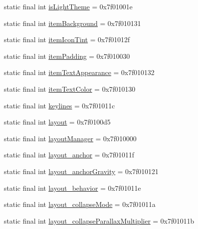 \begin{CompactItemize}
\item 
static final int \hyperlink{classandroid_1_1support_1_1v7_1_1cardview_1_1_r_1_1attr_21d182868570cf817d326710a36ec362}{isLightTheme} = 0x7f01001e
\item 
static final int \hyperlink{classandroid_1_1support_1_1v7_1_1cardview_1_1_r_1_1attr_697033ac5d7d3366d58de9382097c05d}{itemBackground} = 0x7f010131
\item 
static final int \hyperlink{classandroid_1_1support_1_1v7_1_1cardview_1_1_r_1_1attr_e2939f7481d5f41ad2ef121e6dc2c1f9}{itemIconTint} = 0x7f01012f
\item 
static final int \hyperlink{classandroid_1_1support_1_1v7_1_1cardview_1_1_r_1_1attr_5dcdfb800377892cf5fe1866c4266776}{itemPadding} = 0x7f010030
\item 
static final int \hyperlink{classandroid_1_1support_1_1v7_1_1cardview_1_1_r_1_1attr_b86bd1df4adaa529547f0f2ddbef315b}{itemTextAppearance} = 0x7f010132
\item 
static final int \hyperlink{classandroid_1_1support_1_1v7_1_1cardview_1_1_r_1_1attr_aa02dc8fca09643ceaed5ce538596b62}{itemTextColor} = 0x7f010130
\item 
static final int \hyperlink{classandroid_1_1support_1_1v7_1_1cardview_1_1_r_1_1attr_b5244d8d9e79fc6956b6643361068230}{keylines} = 0x7f01011c
\item 
static final int \hyperlink{classandroid_1_1support_1_1v7_1_1cardview_1_1_r_1_1attr_b4bde139a358634c17f871fc784d4e5e}{layout} = 0x7f0100d5
\item 
static final int \hyperlink{classandroid_1_1support_1_1v7_1_1cardview_1_1_r_1_1attr_5cc6a8c004ddc7d7bf14401c9725f82d}{layoutManager} = 0x7f010000
\item 
static final int \hyperlink{classandroid_1_1support_1_1v7_1_1cardview_1_1_r_1_1attr_10e71d2b9ba9fda4306beeef2573ab2f}{layout\_\-anchor} = 0x7f01011f
\item 
static final int \hyperlink{classandroid_1_1support_1_1v7_1_1cardview_1_1_r_1_1attr_8b3d3f7764b7a258abf0e4c73c4db21c}{layout\_\-anchorGravity} = 0x7f010121
\item 
static final int \hyperlink{classandroid_1_1support_1_1v7_1_1cardview_1_1_r_1_1attr_be9d82b9effe18b8d76be0d20b940cad}{layout\_\-behavior} = 0x7f01011e
\item 
static final int \hyperlink{classandroid_1_1support_1_1v7_1_1cardview_1_1_r_1_1attr_28b929e78961fa3ed9d9c0cdf1e00fe3}{layout\_\-collapseMode} = 0x7f01011a
\item 
static final int \hyperlink{classandroid_1_1support_1_1v7_1_1cardview_1_1_r_1_1attr_aeb31de49bf707ec199d40807fd34ca8}{layout\_\-collapseParallaxMultiplier} = 0x7f01011b

\end{CompactItemize}
